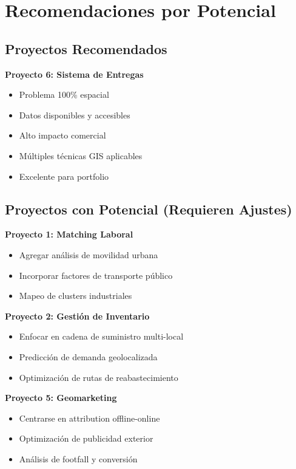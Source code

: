 \documentclass[11pt,a4paper]{article}
\newcommand{\alto}[1]{\textcolor{verde}{\textbf{#1}}}
\newcommand{\medio}[1]{\textcolor{amarillo}{\textbf{#1}}}
\begin{document}
\newpage

\section{Recomendaciones por Potencial}

\subsection{Proyectos Recomendados}

\begin{tcolorbox}[colframe=verde,colback=green!10,title=\alto{ALTO POTENCIAL}]
\textbf{Proyecto 6: Sistema de Entregas}
\begin{itemize}
    \item Problema 100\% espacial
    \item Datos disponibles y accesibles
    \item Alto impacto comercial
    \item Múltiples técnicas GIS aplicables
    \item Excelente para portfolio
\end{itemize}
\end{tcolorbox}

\subsection{Proyectos con Potencial (Requieren Ajustes)}

\begin{tcolorbox}[colframe=amarillo,colback=yellow!10,title=\medio{POTENCIAL MEDIO}]
\textbf{Proyecto 1: Matching Laboral}
\begin{itemize}
    \item Agregar análisis de movilidad urbana
    \item Incorporar factores de transporte público
    \item Mapeo de clusters industriales
\end{itemize}

\textbf{Proyecto 2: Gestión de Inventario}
\begin{itemize}
    \item Enfocar en cadena de suministro multi-local
    \item Predicción de demanda geolocalizada
    \item Optimización de rutas de reabastecimiento
\end{itemize}

\textbf{Proyecto 5: Geomarketing}
\begin{itemize}
    \item Centrarse en attribution offline-online
    \item Optimización de publicidad exterior
    \item Análisis de footfall y conversión
\end{itemize}
\end{tcolorbox}
\end{document}
